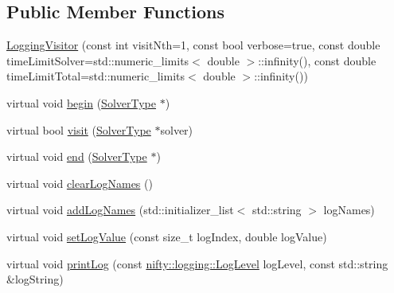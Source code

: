 \subsection*{Public Member Functions}
\begin{DoxyCompactItemize}
\item 
\hyperlink{classnifty_1_1graph_1_1optimization_1_1common_1_1LoggingVisitor_a4e186902e51f27ca16814e8660d4c839}{Logging\+Visitor} (const int visit\+Nth=1, const bool verbose=true, const double time\+Limit\+Solver=std\+::numeric\+\_\+limits$<$ double $>$\+::infinity(), const double time\+Limit\+Total=std\+::numeric\+\_\+limits$<$ double $>$\+::infinity())
\item 
virtual void \hyperlink{classnifty_1_1graph_1_1optimization_1_1common_1_1LoggingVisitor_a0d371764a35038bb959c30787ee27115}{begin} (\hyperlink{classnifty_1_1graph_1_1optimization_1_1common_1_1LoggingVisitor_a948f90213104a37e586b5024cb918f40}{Solver\+Type} $\ast$)
\item 
virtual bool \hyperlink{classnifty_1_1graph_1_1optimization_1_1common_1_1LoggingVisitor_a09686da1cd21063cf5fbe6c80fd7eaf2}{visit} (\hyperlink{classnifty_1_1graph_1_1optimization_1_1common_1_1LoggingVisitor_a948f90213104a37e586b5024cb918f40}{Solver\+Type} $\ast$solver)
\item 
virtual void \hyperlink{classnifty_1_1graph_1_1optimization_1_1common_1_1LoggingVisitor_ab5e361c429ce734f000be8396b2b08d8}{end} (\hyperlink{classnifty_1_1graph_1_1optimization_1_1common_1_1LoggingVisitor_a948f90213104a37e586b5024cb918f40}{Solver\+Type} $\ast$)
\item 
virtual void \hyperlink{classnifty_1_1graph_1_1optimization_1_1common_1_1LoggingVisitor_ab0c92d5a637a2f4184bc8b3616b7c1d7}{clear\+Log\+Names} ()
\item 
virtual void \hyperlink{classnifty_1_1graph_1_1optimization_1_1common_1_1LoggingVisitor_a937aea0724cef965a33c13f80600e5d3}{add\+Log\+Names} (std\+::initializer\+\_\+list$<$ std\+::string $>$ log\+Names)
\item 
virtual void \hyperlink{classnifty_1_1graph_1_1optimization_1_1common_1_1LoggingVisitor_aa4d1b29f58c61e836488869f2171bbe1}{set\+Log\+Value} (const size\+\_\+t log\+Index, double log\+Value)
\item 
virtual void \hyperlink{classnifty_1_1graph_1_1optimization_1_1common_1_1LoggingVisitor_adb75d5a267ca5465a9d01a88fd160e74}{print\+Log} (const \hyperlink{namespacenifty_1_1logging_a3385625f9a0dbb17f70c47d3fca2f64d}{nifty\+::logging\+::\+Log\+Level} log\+Level, const std\+::string \&log\+String)

\end{DoxyCompactItemize}

